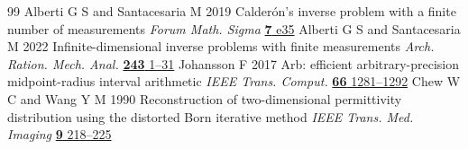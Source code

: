 \begin{thebibliography}{99}
Alberti G S and Santacesaria M 2019 Calder\'on's inverse problem with a finite number of measurements \emph{Forum Math. Sigma} \href{https://doi.org/10.1017/fms.2019.31}{\textbf{7} e35}
Alberti G S and Santacesaria M 2022 Infinite-dimensional inverse problems with finite measurements \emph{Arch. Ration. Mech. Anal.} \href{https://doi.org/10.1007/s00205-021-01718-4}{\textbf{243} 1--31}
 Johansson F 2017 Arb: efficient arbitrary-precision midpoint-radius interval arithmetic \emph{IEEE Trans. Comput.} \href{https://doi.org/10.1109/TC.2017.2690633}{\textbf{66} 1281--1292}
 Chew W C and Wang Y M 1990 Reconstruction of two-dimensional permittivity distribution using the distorted Born iterative method \emph{IEEE Trans. Med. Imaging} \href{https://doi.org/10.1109/42.56334}{\textbf{9} 218--225}
\end{thebibliography}
